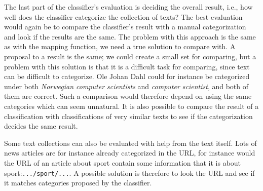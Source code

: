 The last part of the classifier's evaluation is deciding the overall result, i.e., how well does the classifier categorize the collection of texts? The best evaluation would again be to compare the classifier's result with a manual categorization and look if the results are the same. The problem with this approach is the same as with the mapping function, we need a true solution to compare with. A proposal to a result is the same; we could create a small set for comparing, but a problem with this solution is that it is a difficult task for comparing, since text can be difficult to categorize. Ole Johan Dahl could for instance be categorized under both \textit{Norwegian computer scientists} and \textit{computer scientist}, and both of them are correct. Such a comparison would therefore depend on using the same categories which can seem unnatural. It is also possible to compare the result of a classification with classifications of very similar texts to see if the categorization decides the same result. 

Some text collections can also be evaluated with help from the text itself. Lots of news articles are for instance already categorized in the URL, for instance would the URL of an article about sport contain  some information that it is about sport:\texttt{.../sport/...}. A possible solution is therefore to look the URL and see if it matches categories proposed by the classifier. 
